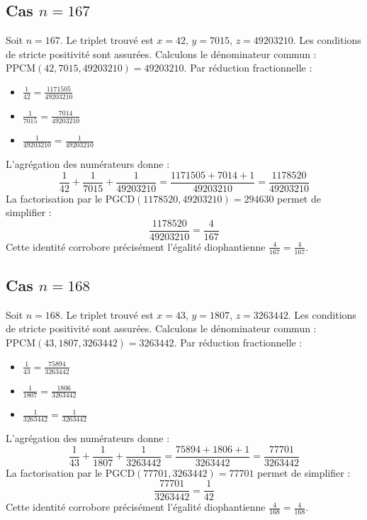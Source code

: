 \documentclass[11pt,a4paper]{article}
\begin{document}
\subsection{Cas $n = 167$}
Soit $n = 167$. Le triplet trouvé est $x = 42$, $y = 7015$, $z = 49203210$.
Les conditions de stricte positivité sont assurées.
Calculons le dénominateur commun : $\text{PPCM}(42, 7015, 49203210) = 49203210$.
Par réduction fractionnelle :
\begin{itemize}
    \item $\frac{1}{42} = \frac{1171505}{49203210}$
    \item $\frac{1}{7015} = \frac{7014}{49203210}$
    \item $\frac{1}{49203210} = \frac{1}{49203210}$
\end{itemize}
L'agrégation des numérateurs donne :
$$ \frac{1}{42} + \frac{1}{7015} + \frac{1}{49203210} = \frac{1171505 + 7014 + 1}{49203210} = \frac{1178520}{49203210} $$
La factorisation par le $\text{PGCD}(1178520, 49203210) = 294630$ permet de simplifier :
$$ \frac{1178520}{49203210} = \frac{4}{167} $$
Cette identité corrobore précisément l'égalité diophantienne $\frac{4}{167} = \frac{4}{167}$.

\subsection{Cas $n = 168$}
Soit $n = 168$. Le triplet trouvé est $x = 43$, $y = 1807$, $z = 3263442$.
Les conditions de stricte positivité sont assurées.
Calculons le dénominateur commun : $\text{PPCM}(43, 1807, 3263442) = 3263442$.
Par réduction fractionnelle :
\begin{itemize}
    \item $\frac{1}{43} = \frac{75894}{3263442}$
    \item $\frac{1}{1807} = \frac{1806}{3263442}$
    \item $\frac{1}{3263442} = \frac{1}{3263442}$
\end{itemize}
L'agrégation des numérateurs donne :
$$ \frac{1}{43} + \frac{1}{1807} + \frac{1}{3263442} = \frac{75894 + 1806 + 1}{3263442} = \frac{77701}{3263442} $$
La factorisation par le $\text{PGCD}(77701, 3263442) = 77701$ permet de simplifier :
$$ \frac{77701}{3263442} = \frac{1}{42} $$
Cette identité corrobore précisément l'égalité diophantienne $\frac{4}{168} = \frac{4}{168}$.
\end{document}

